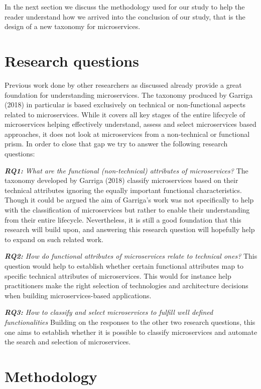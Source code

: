 \documentclass{article}
\begin{document}
In the next section we discuss the methodology used for our study to help the reader understand how we arrived into the conclusion of our study, that is the design of a new taxonomy for microservices.

\section{Research questions}

Previous work done by other researchers as discussed already provide a great foundation for understanding microservices. The taxonomy produced by Garriga (2018) in particular is based exclusively on technical or non-functional aspects related to microservices. While it covers all key stages of the entire lifecycle of microservices helping effectively understand, assess and select microservices based approaches, it does not look at microservices from a non-technical or functional prism. In order to close that gap we try to answer the following research questions:

\textit{\textbf{RQ1:} What are the functional (non-technical) attributes of microservices?} The taxonomy developed by Garriga (2018) classify microservices based on their technical attributes ignoring the equally important functional characteristics. Though it could be argued the aim of Garriga's work was not specifically to help with the classification of microservices but rather to enable their understanding from their entire lifecycle. Nevertheless, it is still a good foundation that this research will build upon, and answering this research question will hopefully help to expand on such related work. 

\textit{\textbf{RQ2:} How do functional attributes of microservices relate to technical ones?} This question would help to establish whether certain functional attributes map to specific technical attributes of microservices. This would for instance help practitioners make the right selection of technologies and architecture decisions when building microservices-based applications.

\textit{\textbf{RQ3:} How to classify and select microservices to fulfill well defined functionalities} Building on the responses to the other two research questions, this one aims to establish whether it is possible to classify microservices and automate the search and selection of microservices.


\section{Methodology}
\end{document}
